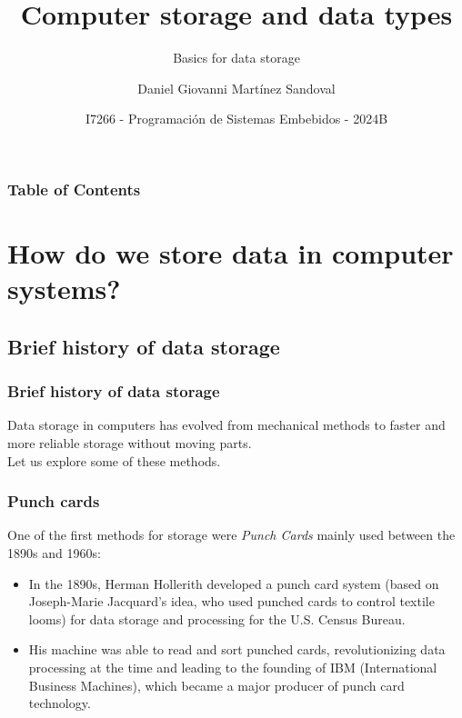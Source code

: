 \documentclass[aspectratio=169]{beamer}
\title[Computer storage and data types] %
{Computer storage and data types}
\subtitle{Basics for data storage}
\author{Daniel Giovanni Martínez Sandoval}
\institute[CUCEI - UDG]
{
  \textsc{
  Centro Universitario de Ciencias Exactas e Ingenierías\\
  Universidad de Guadalajara
  }
}
\date[I7266 - 24B] %
{\footnotesize I7266 - Programación de Sistemas Embebidos - 2024B }
\begin{document}
\frame{\titlepage}


\begin{frame}
\frametitle{Table of Contents}
\tableofcontents
\end{frame}


\section{How do we store data in computer systems?}
\subsection{Brief history of data storage}

\begin{frame}
\frametitle{Brief history of data storage}
Data storage in computers has evolved from mechanical methods to faster and more reliable storage without moving parts. \\[5mm] \pause
Let us explore some of these methods.
\end{frame}

\begin{frame}
  \frametitle{Punch cards}
  One of the first methods for storage were \textit{Punch Cards} mainly used between the 1890s and 1960s: \pause
  \begin{itemize}
    \item In the 1890s, Herman Hollerith developed a punch card system (based on Joseph-Marie Jacquard's idea, who used punched cards to control textile looms) for data storage and processing for the U.S. Census Bureau. \pause
    \item His machine was able to read and sort punched cards, revolutionizing data processing at the time and leading to the founding of IBM (International Business Machines), which became a major producer of punch card technology.
  \end{itemize}
\end{frame}
\end{document}
